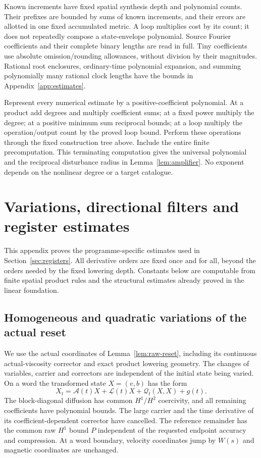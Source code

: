 \documentclass[11pt,a4paper]{amsart}
\theoremstyle{definition}
\theoremstyle{remark}
\numberwithin{equation}{section}
\begin{document}
Known increments have fixed spatial synthesis depth and polynomial
counts.  Their prefixes are bounded by sums of known increments,
and their errors are allotted in one fixed accumulated metric.
A loop multiplies cost by its count; it does not repeatedly compose
a state-envelope polynomial.  Source Fourier coefficients and their
complete binary lengths are read in full.  Tiny coefficients use
absolute omission/rounding allowances, without division by their
magnitudes.  Rational root enclosures, ordinary-time polynomial
expansion, and summing polynomially many rational clock lengths have
the bounds in Appendix~\ref{app:estimates}.

Represent every numerical estimate by a positive-coefficient
polynomial.  At a product add degrees and multiply coefficient sums;
at a fixed power multiply the degree; at a positive minimum sum
reciprocal bounds; at a loop multiply the operation/output count by
the proved loop bound.  Perform these operations through the fixed
construction tree above.  Include the entire finite precomputation.
This terminating computation gives the universal polynomial and the
reciprocal disturbance radius in Lemma~\ref{lem:amplifier}.
No exponent depends on the nonlinear degree or a target catalogue.

\section{Variations, directional filters and register estimates}\label{app:register-estimates}
This appendix proves the programme-specific estimates used in
Section~\ref{sec:registers}.  All derivative orders are fixed once and for
all, beyond the orders needed by the fixed lowering depth.  Constants below
are computable from finite spatial product rules and the structural estimates
already proved in the linear foundation.

\subsection{Homogeneous and quadratic variations of the actual reset}
We use the actual coordinates of Lemma~\ref{lem:raw-reset}, including its
continuous actual-viscosity corrector and exact product lowering geometry.
The changes of variables, carrier and correctors are independent of the
initial state being varied.  On a word the transformed state $X=(v,b)$ has
the form
\begin{equation}\label{eq:register-transformed-abstract}
 X_t=\mathcal A(t)X+\mathcal L(t)X+\mathcal Q_t(X,X)+g(t).
\end{equation}
The block-diagonal diffusion has common $H^1/H^2$ coercivity, and all
remaining coefficients have polynomial bounds.  The large carrier and
the time derivative of its coefficient-dependent corrector have cancelled.
The reference remainder has the common raw $H^1$ bound $P$ independent of
the requested endpoint accuracy and compression.  At a word boundary,
velocity coordinates jump by $W(s)$ and magnetic coordinates are unchanged.
\end{document}
